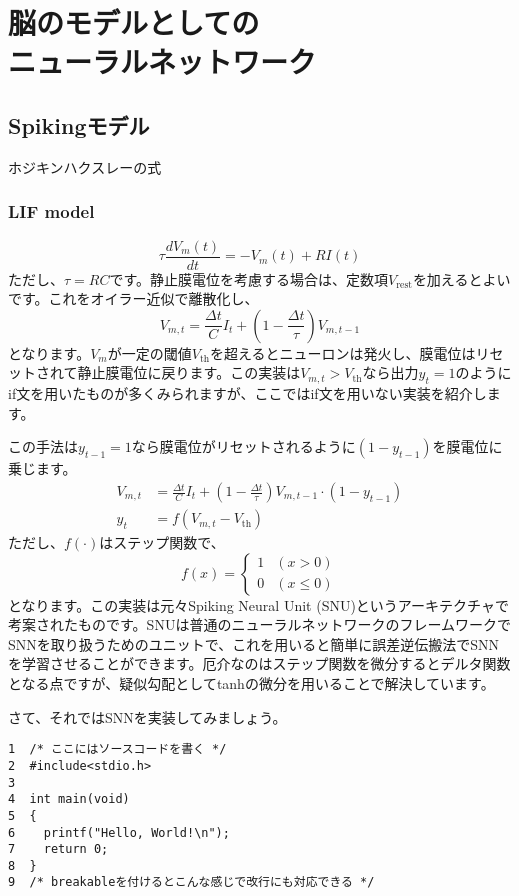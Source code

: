 \documentclass[11pt,dvipdfmx,b5paper,oneside]{jsbook}
\begin{document}
\chapter[脳のモデルとしてのニューラルネットワーク]{脳のモデルとしての\\ニューラルネットワーク}
\section{Spikingモデル}
ホジキンハクスレーの式
\subsection{LIF model}

$$
\tau \frac{dV_{m}(t)}{dt}=-V_{m}(t)+R I(t)
$$
ただし、$\tau=RC$です。静止膜電位を考慮する場合は、定数項$V_{\text{rest}}$を加えるとよいです。これをオイラー近似で離散化し、
$$
V_{m, t}=\frac{\Delta t}{C} I_{t}+\left(1-\frac{\Delta t}{\tau}\right)V_{m, t-1}
$$
となります。$V_m$が一定の閾値$V_{\text{th}}$を超えるとニューロンは発火し、膜電位はリセットされて静止膜電位に戻ります。この実装は$V_{m,t} > V_{\text{th}}$なら出力$y_{t}=1$のようにif文を用いたものが多くみられますが、ここではif文を用いない実装を紹介します。\par
この手法は$y_{t-1}=1$なら膜電位がリセットされるように$\left(1-y_{t-1}\right)$を膜電位に乗じます。
\begin{align*}
V_{m, t}&=\frac{\Delta t}{C} I_{t}+\left(1-\frac{\Delta t}{\tau}\right)V_{m, t-1}\cdot \left(1-y_{t-1}\right)\\
y_{t}&=f\left(V_{m, t}-V_{\text{th}}\right) 
\end{align*}
ただし、$f(\cdot)$はステップ関数で、
$$
f(x) = \begin{cases}
    1 & (x>0) \\
    0 & (x\leq0)
  \end{cases}
$$
となります。この実装は元々Spiking Neural Unit (SNU)というアーキテクチャで考案されたものです。SNUは普通のニューラルネットワークのフレームワークでSNNを取り扱うためのユニットで、これを用いると簡単に誤差逆伝搬法でSNNを学習させることができます。厄介なのはステップ関数を微分するとデルタ関数となる点ですが、疑似勾配としてtanhの微分を用いることで解決しています。\par
さて、それではSNNを実装してみましょう。
\begin{tcolorbox}[breakable, title=SNN.py]
\begin{verbatim}
1  /* ここにはソースコードを書く */
2  #include<stdio.h>
3
4  int main(void)
5  {
6    printf("Hello, World!\n");
7    return 0;
8  }
9  /* breakableを付けるとこんな感じで改行にも対応できる */
\end{verbatim}
\end{tcolorbox}
\end{document}
